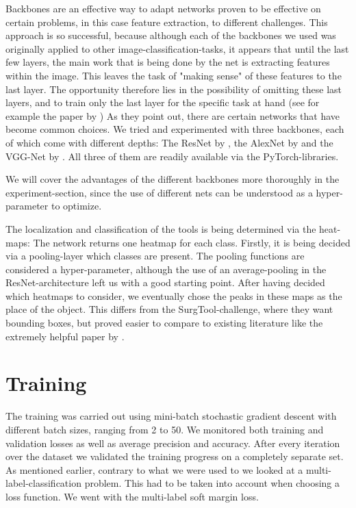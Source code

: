 Backbones are an effective way to adapt networks proven to be effective on certain problems, in this case feature extraction, to different challenges. This approach is so successful, because although each of the backbones we used was originally applied to other image-classification-tasks, it appears that until the last few layers, the main work that is being done by the net is extracting features within the image. This leaves the task of "making sense" of these features to the last layer. The opportunity therefore lies in the possibility of omitting these last layers, and to train only the last layer for the specific task at hand (see for example the paper by \cite{https://doi.org/10.48550/arxiv.2206.08016}) As they point out, there are certain networks that have become common choices.
We tried and experimented with three backbones, each of which come with different depths: The ResNet by \cite{https://doi.org/10.48550/arxiv.1512.03385}, the AlexNet by \cite{krizhevsky2017imagenet} and the VGG-Net by \cite{https://doi.org/10.48550/arxiv.1409.1556}.
All three of them are readily available via the PyTorch-libraries.

We will cover the advantages of the different backbones more thoroughly in the experiment-section, since the use of different nets can be understood as a hyper-parameter to optimize.

The localization and classification of the tools is being determined via the heat-maps: The network returns one heatmap for each class. Firstly, it is being decided via a pooling-layer which classes are present. The pooling functions are considered a hyper-parameter, although the use of an average-pooling in the ResNet-architecture left us with a good starting point. After having decided which heatmaps to consider, we eventually chose the peaks in these maps as the place of the object. This differs from the SurgTool-challenge, where they want bounding boxes, but proved easier to compare to existing literature like the extremely helpful paper by \cite{Vardazaryan}.

\section{Training}

The training was carried out using mini-batch stochastic gradient descent with different batch sizes, ranging from 2 to 50. We monitored both training and validation losses as well as average precision and accuracy.  After every iteration over the dataset we validated the training progress on a completely separate set.
As mentioned earlier, contrary to what we were used to we looked at a multi-label-classification problem. This had to be taken into account when choosing a loss function. We went with the multi-label soft margin loss.

